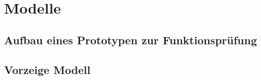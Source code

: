 
\chapter{Modelle}
\label{sec:modelle}

\section{Aufbau eines Prototypen zur Funktionsprüfung}
\label{sec:prototyp}


\section{Vorzeige Modell}
\label{sec:vormodell}
